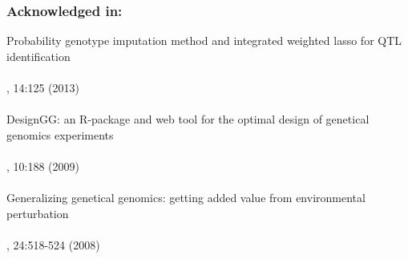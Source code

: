 \subsubsection*{Acknowledged in:}
  Probability genotype imputation method and integrated weighted lasso for QTL identification\\
  \\
  , 14:125 (2013)\\\\   
  DesignGG: an R-package and web tool for the optimal design of genetical genomics experiments\\
  \\
  , 10:188 (2009)\\\\
  Generalizing genetical genomics: getting added value from environmental perturbation\\
  \\
  , 24:518-524 (2008)

